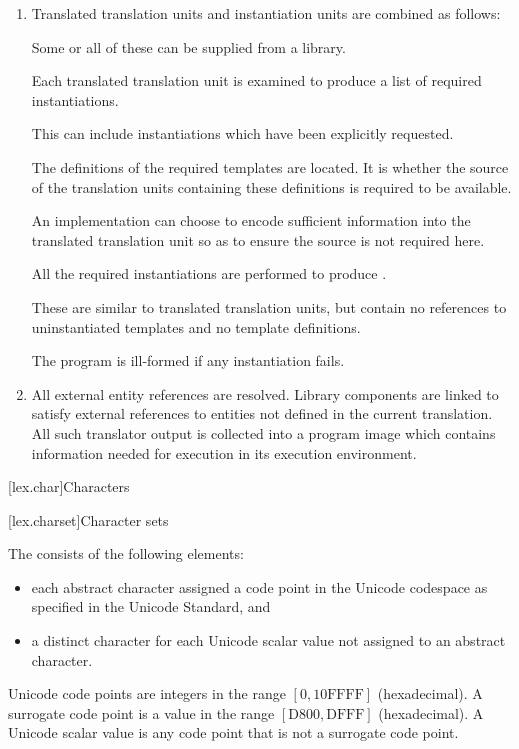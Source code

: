 \begin{enumerate}
\item Translated translation units and instantiation units are combined
as follows:
\begin{note}
Some or all of these can be supplied from a
library.
\end{note}
Each translated translation unit is examined to
produce a list of required instantiations.
\begin{note}
This can include
instantiations which have been explicitly
requested.
\end{note}
The definitions of the
required templates are located. It is  whether the
source of the translation units containing these definitions is required
to be available.
\begin{note}
An implementation can choose to encode sufficient
information into the translated translation unit so as to ensure the
source is not required here.
\end{note}
All the required instantiations
are performed to produce
.
\begin{note}
These are similar
to translated translation units, but contain no references to
uninstantiated templates and no template definitions.
\end{note}
The
program is ill-formed if any instantiation fails.

\item All external entity references are resolved. Library
components are linked to satisfy external references to
entities not defined in the current translation. All such translator
output is collected into a program image which contains information
needed for execution in its execution environment.%
\end{enumerate}

[lex.char]{Characters}%

[lex.charset]{Character sets}

\pnum
{}%
The  consists of the following elements:
\begin{itemize}
\item
each abstract character assigned a code point in the Unicode codespace
as specified in the Unicode Standard, and
\item
a distinct character for each Unicode scalar value
not assigned to an abstract character.
\end{itemize}
\begin{note}
Unicode code points are integers
in the range $[0, \mathrm{10FFFF}]$ (hexadecimal).
A surrogate code point is a value
in the range $[\mathrm{D800}, \mathrm{DFFF}]$ (hexadecimal).
A Unicode scalar value is any code point that is not a surrogate code point.
\end{note}

